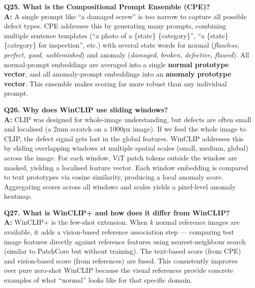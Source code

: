 \documentclass[12pt, a4paper]{article}
\begin{document}
\begin{qa}
\textbf{Q25. What is the Compositional Prompt Ensemble (CPE)?}\\[4pt]
\textbf{A:} A single prompt like ``a damaged screw'' is too narrow to capture all possible defect types. CPE addresses this by generating many prompts, combining multiple sentence templates (``a photo of a \{state\} \{category\}'', ``a \{state\} \{category\} for inspection'', etc.) with several state words for normal (\textit{flawless, perfect, good, unblemished}) and anomaly (\textit{damaged, broken, defective, flawed}). All normal-prompt embeddings are averaged into a single \textbf{normal prototype vector}, and all anomaly-prompt embeddings into an \textbf{anomaly prototype vector}. This ensemble makes scoring far more robust than any individual prompt.
\end{qa}

\begin{qa}
\textbf{Q26. Why does WinCLIP use sliding windows?}\\[4pt]
\textbf{A:} CLIP was designed for whole-image understanding, but defects are often small and localised (a 2mm scratch on a 1000px image). If we feed the whole image to CLIP, the defect signal gets lost in the global features. WinCLIP addresses this by sliding overlapping windows at multiple spatial scales (small, medium, global) across the image. For each window, ViT patch tokens outside the window are masked, yielding a localised feature vector. Each window embedding is compared to text prototypes via cosine similarity, producing a local anomaly score. Aggregating scores across all windows and scales yields a pixel-level anomaly heatmap.
\end{qa}

\begin{qa}
\textbf{Q27. What is WinCLIP+ and how does it differ from WinCLIP?}\\[4pt]
\textbf{A:} WinCLIP+ is the few-shot extension. When $k$ normal reference images are available, it adds a vision-based reference association step --- comparing test image features directly against reference features using nearest-neighbour search (similar to PatchCore but without training). The text-based score (from CPE) and vision-based score (from references) are fused. This consistently improves over pure zero-shot WinCLIP because the visual references provide concrete examples of what ``normal'' looks like for that specific domain.
\end{qa}
\end{document}

